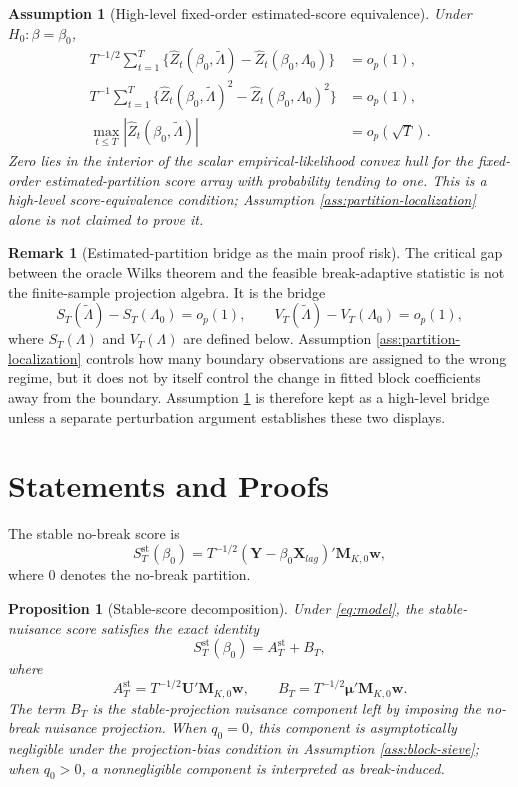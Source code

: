 \documentclass[12pt]{article}
\numberwithin{equation}{section}
\newtheorem{proposition}{Proposition}
\newtheorem{assumption}{Assumption}
\theoremstyle{definition}
\newtheorem{remark}{Remark}
\begin{document}
\begin{assumption}[High-level fixed-order estimated-score equivalence]
\label{ass:estimated-score}
Under \(H_0:\beta=\beta_0\),
\begin{align}
    T^{-1/2}\sum_{t=1}^T
    \{\widehat Z_t(\beta_0,\widetilde\Lambda)-\widehat Z_t(\beta_0,\Lambda_0)\}
    &=o_p(1),
    \label{eq:estimated-score-num}\\
    T^{-1}\sum_{t=1}^T
    \{\widehat Z_t(\beta_0,\widetilde\Lambda)^2-\widehat Z_t(\beta_0,\Lambda_0)^2\}
    &=o_p(1),
    \label{eq:estimated-score-den}\\
    \max_{t\leq T}|\widehat Z_t(\beta_0,\widetilde\Lambda)|&=o_p(\sqrt T).
    \label{eq:estimated-score-max}
\end{align}
Zero lies in the interior of the scalar empirical-likelihood convex hull for the fixed-order estimated-partition score array with probability tending to one. This is a high-level score-equivalence condition; Assumption \ref{ass:partition-localization} alone is not claimed to prove it.
\end{assumption}

\begin{remark}[Estimated-partition bridge as the main proof risk]
The critical gap between the oracle Wilks theorem and the feasible break-adaptive statistic is not the finite-sample projection algebra. It is the bridge
\[
    S_T(\widetilde\Lambda)-S_T(\Lambda_0)=o_p(1),
    \qquad
    V_T(\widetilde\Lambda)-V_T(\Lambda_0)=o_p(1),
\]
where \(S_T(\Lambda)\) and \(V_T(\Lambda)\) are defined below. Assumption \ref{ass:partition-localization} controls how many boundary observations are assigned to the wrong regime, but it does not by itself control the change in fitted block coefficients away from the boundary. Assumption \ref{ass:estimated-score} is therefore kept as a high-level bridge unless a separate perturbation argument establishes these two displays.
\end{remark}

\section{Statements and Proofs}

The stable no-break score is
\[
    S_T^{\mathrm{st}}(\beta_0)
    =
    T^{-1/2}(\bm Y-\beta_0\bm X_{lag})'\bm M_{K,0}\bm w,
\]
where \(0\) denotes the no-break partition.

\begin{proposition}[Stable-score decomposition]
\label{prop:stable-decomp}
Under \eqref{eq:model}, the stable-nuisance score satisfies the exact identity
\[
    S_T^{\mathrm{st}}(\beta_0)
    =
    A_T^{\mathrm{st}}
    +
    B_T,
\]
where
\[
    A_T^{\mathrm{st}}
    =
    T^{-1/2}\bm U'\bm M_{K,0}\bm w,
    \qquad
    B_T
    =
    T^{-1/2}\bm\mu'\bm M_{K,0}\bm w.
\]
The term \(B_T\) is the stable-projection nuisance component left by imposing the no-break nuisance projection. When \(q_0=0\), this component is asymptotically negligible under the projection-bias condition in Assumption \ref{ass:block-sieve}; when \(q_0>0\), a nonnegligible component is interpreted as break-induced.
\end{proposition}
\end{document}
